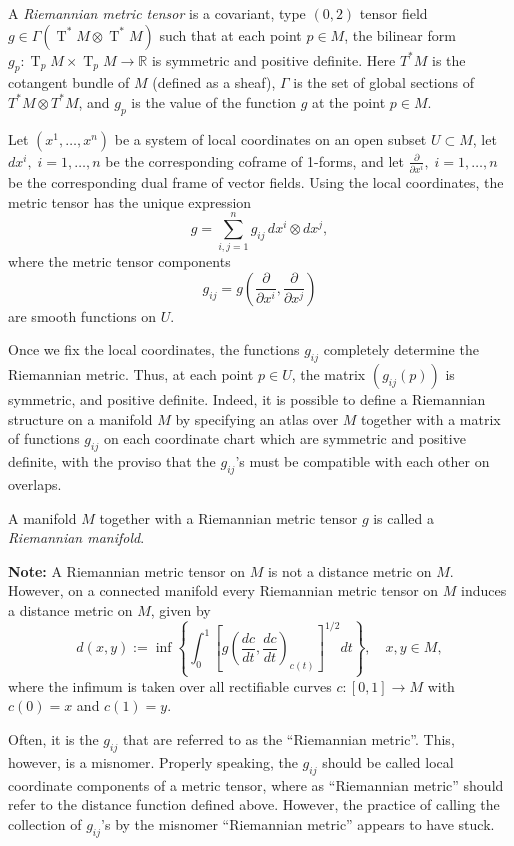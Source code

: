 \documentclass[12pt]{article}
\newcommand{\rT}{\operatorname{T}}
\newcommand{\Rset}{\mathbb{R}}
\newcommand{\ddx}[1]{\frac{\partial}{\partial  x^{#1}}}
\begin{document}
A {\em Riemannian metric tensor} is a covariant, type $(0,2)$ tensor
field 
$g\in\Gamma(\rT^* M\otimes \rT^*M)$ such that at each point $p\in M$,
the bilinear form
$g_p:\rT_pM\times \rT_p M\to \Rset$ is symmetric and
positive definite. Here $T^* M$ is the cotangent bundle of $M$ (defined as a sheaf), $\Gamma$ is the set of global sections of $T^* M \otimes T^* M$, and $g_p$ is the value of the function $g$ at the point $p \in M$.

Let $(x^1,\ldots,x^n)$ be a system of local coordinates on an open
subset $U\subset M$, let $dx^i,\; i=1,\ldots, n$ be the corresponding
coframe of 1-forms, and let $\displaystyle \ddx{i},\; i=1,\ldots, n$
be the corresponding dual frame of vector fields.  Using the local
coordinates, the metric tensor has the unique expression
$$g=\sum_{i,j=1}^n g_{ij}\, dx^i\otimes dx^j,$$
where the metric
tensor components $$g_{ij}=g\left(\ddx{i},\ddx{j}\right)$$
are smooth
functions on $U$.

Once we fix the local coordinates, the functions $g_{ij}$ completely
determine the Riemannian metric.  Thus, at each point $p\in U$, the
matrix $(g_{ij}(p))$ is symmetric, and positive definite.  Indeed, it
is possible to define a Riemannian structure on a manifold $M$ by
specifying an atlas over $M$ together with a matrix of functions
$g_{ij}$ on each coordinate chart which are symmetric and positive
definite, with the proviso that the $g_{ij}$'s must be compatible with
each other on overlaps.

A manifold $M$ together with a Riemannian metric tensor $g$ is called
a {\em Riemannian manifold}.

{\bf Note:} A Riemannian metric tensor on $M$ is not a distance metric
on $M$. However, on a connected manifold every Riemannian metric
tensor on $M$ induces a distance metric on $M$, given by $$
d(x,y) :=
\inf \left\{ \int_0^1 \left[g\!\!\left( \frac{dc}{dt},
      \frac{dc}{dt}\right)_{\!c(t)}\right]^{1/2}dt \right\} ,\quad
x,y\in M,$$
where the infimum is taken over all rectifiable curves
$c:[0,1]\to M$ with $c(0)=x$ and $c(1)=y$.

Often, it is the $g_{ij}$ that are referred to as the ``Riemannian
metric''.  This, however, is a misnomer.  Properly speaking, the
$g_{ij}$ should be called local coordinate components of a metric
tensor, where as ``Riemannian metric'' should refer to the distance
function defined above.  However, the practice of calling the
collection of $g_{ij}$'s by the misnomer ``Riemannian metric'' appears
to have stuck.
\end{document}
